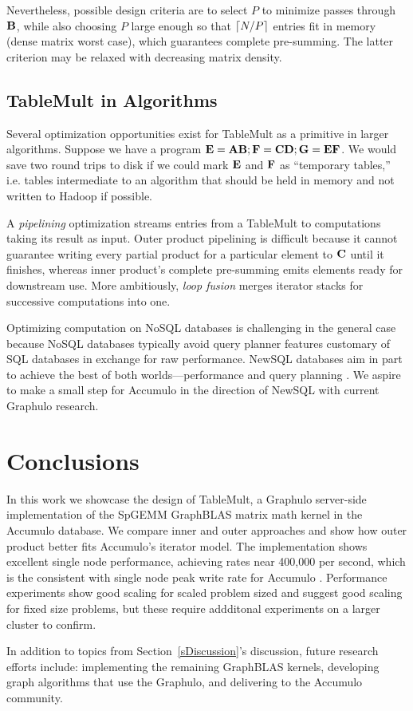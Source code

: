 Nevertheless, possible design criteria are to select $P$ to minimize passes through $\mathbf{B}$,
while also choosing $P$ large enough so that $\lceil N/P\rceil$ entries fit in memory
(dense matrix worst case), which guarantees complete pre-summing.
The latter criterion may be relaxed with decreasing matrix density.


\subsection{TableMult in Algorithms}
Several optimization opportunities exist for TableMult as a primitive in larger algorithms.
Suppose we have a program $\mathbf{E} = \mathbf{A B}; \mathbf{F} = \mathbf{C D}; \mathbf{G} = \mathbf{E F}$.
We would save two round trips to disk if we could mark $\mathbf{E}$ and $\mathbf{F}$ as 
``temporary tables,'' i.e. tables intermediate to an algorithm that should be held in memory 
and not written to Hadoop if possible.

A \emph{pipelining} optimization streams entries from a TableMult 
to computations taking its result as input. 
Outer product pipelining is difficult
because it cannot guarantee writing every partial product for a particular element 
 to $\mathbf{C}$ until it finishes,
whereas inner product's complete pre-summing emits elements ready for downstream use.
More ambitiously, \emph{loop fusion} merges iterator stacks 
for successive computations into one. 

Optimizing computation on NoSQL databases is challenging in the general case because
NoSQL databases typically avoid query planner features 
customary of SQL databases in exchange for raw performance.
NewSQL databases aim in part to achieve the best of both worlds---performance and query planning \cite{grolinger2013data}.
We aspire to make a small step for Accumulo in the direction of NewSQL with current Graphulo research.






\section{Conclusions}
\label{sConclusions}

In this work we showcase the design of TableMult, a Graphulo server-side implementation of the 
SpGEMM GraphBLAS matrix math kernel in the Accumulo database.
We compare inner and outer approaches and show how outer product 
better fits Accumulo's iterator model.  The implementation shows excellent single node performance, achieving rates near 400,000 per second, which is the consistent with single node peak write rate for Accumulo \cite{kepner2014achieving}.
Performance experiments show good scaling for scaled problem sized and suggest good scaling for fixed size problems,
but these require addditonal experiments on a larger cluster to confirm.

In addition to topics from Section~\ref{sDiscussion}'s discussion, future research efforts include: 
implementing the remaining GraphBLAS kernels, 
developing graph algorithms that use the Graphulo, %
and delivering to the Accumulo community.
